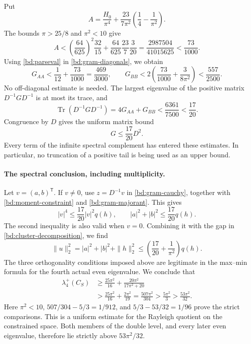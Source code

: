 \documentclass[11pt,reqno]{amsart}
\numberwithin{equation}{section}
\begin{document}
Put
\[
 A=\frac{H_0}{\pi^4}
     +\frac{23}{7\pi^2}\left(\frac14-\frac1{\pi^2}\right).
\]
The bounds $\pi>25/8$ and $\pi^2<10$ give
\begin{equation}
 A<\left(\frac{64}{625}\right)^2\frac{32}{15}
       +\frac{64}{625}\frac{23}{7}\frac3{20}
   =\frac{2987504}{41015625}<\frac{73}{1000}.
 \label{bd:rational-A}
\end{equation}
Using \eqref{bd:parseval} in \eqref{bd:gram-diagonals}, we obtain
\begin{equation}
 G_{AA}<\frac1{12}+\frac{73}{1000}=\frac{469}{3000},\qquad
 G_{BB}<2\left(\frac{73}{1000}+\frac3{8\pi^2}\right)
       <\frac{557}{2500}.
 \label{bd:gram-rational}
\end{equation}
No off-diagonal estimate is needed. The largest eigenvalue of the
positive matrix $D^{-1}GD^{-1}$ is at most its trace, and
\[
 \operatorname{Tr}(D^{-1}GD^{-1})
 =4G_{AA}+G_{BB}<\frac{6361}{7500}<\frac{17}{20}.
\]
Congruence by $D$ gives the uniform matrix bound
\begin{equation}
 G\le\frac{17}{20}D^2.
 \label{bd:gram-majorant}
\end{equation}
Every term of the infinite spectral complement has entered these
estimates. In particular, no truncation of a positive tail is being used
as an upper bound.

\paragraph{The spectral conclusion, including multiplicity.}
Let $v=(a,b)^{\mathsf T}$. If $v\ne0$, use $z=D^{-1}v$ in
\eqref{bd:gram-cauchy}, together with
\eqref{bd:moment-constraint} and \eqref{bd:gram-majorant}. This gives
\[
 |v|^4\le\frac{17}{20}|v|^2q(h),\qquad
 |a|^2+|b|^2\le\frac{17}{20}q(h).
\]
The second inequality is also valid when $v=0$. Combining it with the
gap in \eqref{bd:cluster-decomposition}, we find
\[
 \|u\|_2^2=|a|^2+|b|^2+\|h\|_2^2
 \le\left(\frac{17}{20}+\frac1{\pi^2}\right)q(h).
\]
The three orthogonality conditions imposed above are legitimate in the
max--min formula for the fourth actual even eigenvalue. We conclude that
\begin{equation}
 \begin{aligned}
  \lambda_4^{+}(C_S)
  &\ge\frac{25\pi^2}{16}+\frac{20\pi^2}{17\pi^2+20}\\
  &>\frac{25\pi^2}{16}+\frac{2\pi^2}{19}
   =\frac{507\pi^2}{304}>\frac{5\pi^2}{3}>\frac{53\pi^2}{32}.
 \end{aligned}
 \label{bd:double-lift}
\end{equation}
Here $\pi^2<10$, $507/304-5/3=1/912$, and
$5/3-53/32=1/96$ prove the strict comparisons. This is a uniform estimate for
the Rayleigh quotient on the constrained space. Both members of the
double level, and every later even eigenvalue, therefore lie strictly
above $53\pi^2/32$.
\end{document}
